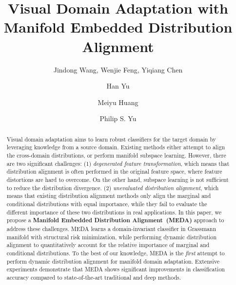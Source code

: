 \documentclass[sigconf]{acmart}
\begin{document}
\title{Visual Domain Adaptation with Manifold Embedded Distribution Alignment}


\author{Jindong Wang, Wenjie Feng, Yiqiang Chen}

\author{Han Yu}


\author{Meiyu Huang}


\author{Philip S. Yu}






\begin{abstract}
Visual domain adaptation aims to learn robust classifiers for the target domain by leveraging knowledge from a source domain. Existing methods either attempt to align the cross-domain distributions, or perform manifold subspace learning. However, there are two significant challenges: (1) \textit{degenerated feature transformation}, which means that distribution alignment is often performed in the original feature space, where feature distortions are hard to overcome. On the other hand, subspace learning is not sufficient to reduce the distribution divergence. (2) \textit{unevaluated distribution alignment}, which means that existing distribution alignment methods only align the marginal and conditional distributions with equal importance, while they fail to evaluate the different importance of these two distributions in real applications. In this paper, we propose a \textbf{Manifold Embedded Distribution Alignment~(MEDA)} approach to address these challenges. MEDA learns a domain-invariant classifier in Grassmann manifold with structural risk minimization, while performing dynamic distribution alignment to quantitatively account for the relative importance of marginal and conditional distributions. To the best of our knowledge, MEDA is the \textit{first} attempt to perform dynamic distribution alignment for manifold domain adaptation. Extensive experiments demonstrate that MEDA shows significant improvements in classification accuracy compared to state-of-the-art traditional and deep methods.
\end{abstract}
\end{document}
